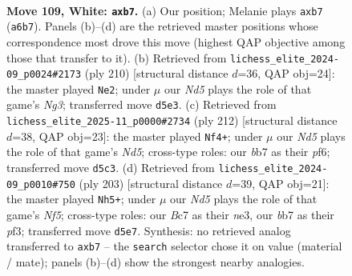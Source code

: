\documentclass[11pt]{article}
\begin{document}
\clearpage

\begin{figure}[p]\centering
\begin{subfigure}{0.46\textwidth}\centering
\resizebox{\linewidth}{!}{%
\newchessgame
\chessboard[
  setfen={8/1bB5/P1k5/3N2R1/1K6/7p/8/8 w - - 0 109},
  showmover=false,
  pgfstyle=straightmove, color=movearrow, markmove={a6-b7}
]}
\caption{}
\end{subfigure}\hfill
\begin{subfigure}{0.46\textwidth}\centering
\resizebox{\linewidth}{!}{%
\newchessgame
\chessboard[
  setfen={8/5p2/8/5Bk1/4K3/6N1/8/2b5 w - - 3 106},
  showmover=false,
  pgfstyle=straightmove, color=movearrow, markmove={g3-e2}
]}
\caption{}
\end{subfigure}
\\[4pt]
\begin{subfigure}{0.46\textwidth}\centering
\resizebox{\linewidth}{!}{%
\newchessgame
\chessboard[
  setfen={8/7b/4kp2/3N3P/6P1/4K3/8/8 w - - 21 107},
  showmover=false,
  pgfstyle=straightmove, color=movearrow, markmove={d5-f4}
]}
\caption{}
\end{subfigure}\hfill
\begin{subfigure}{0.46\textwidth}\centering
\resizebox{\linewidth}{!}{%
\newchessgame
\chessboard[
  setfen={8/8/4k3/8/r4n2/4NPK1/1R6/8 b - - 74 102},
  showmover=false,
  pgfstyle=straightmove, color=movearrow, markmove={f4-h5}
]}
\caption{}
\end{subfigure}
\caption{\textbf{Move 109, White: \texttt{axb7}.} (a) Our position; Melanie plays \texttt{axb7} (\texttt{a6b7}). Panels (b)--(d) are the retrieved master positions whose correspondence most drove this move (highest QAP objective among those that transfer to it). (b) Retrieved from \texttt{lichess\_elite\_2024-09\_p0024\#2173} (ply 210) [structural distance $d$=36, QAP obj=24]: the master played \texttt{Ne2}; under $\mu$ our \emph{Nd5} plays the role of that game's \emph{Ng3}; transferred move \texttt{d5e3}. (c) Retrieved from \texttt{lichess\_elite\_2025-11\_p0000\#2734} (ply 212) [structural distance $d$=38, QAP obj=23]: the master played \texttt{Nf4+}; under $\mu$ our \emph{Nd5} plays the role of that game's \emph{Nd5}; cross-type roles: our \emph{b}b7 as their \emph{p}f6; transferred move \texttt{d5c3}. (d) Retrieved from \texttt{lichess\_elite\_2024-09\_p0010\#750} (ply 203) [structural distance $d$=39, QAP obj=21]: the master played \texttt{Nh5+}; under $\mu$ our \emph{Nd5} plays the role of that game's \emph{Nf5}; cross-type roles: our \emph{B}c7 as their \emph{n}e3, our \emph{b}b7 as their \emph{p}f3; transferred move \texttt{d5e7}. Synthesis: no retrieved analog transferred to \texttt{axb7} -- the \texttt{search} selector chose it on value (material / mate); panels (b)--(d) show the strongest nearby analogies.}
\label{fig:thought-m216}
\end{figure}
\end{document}
